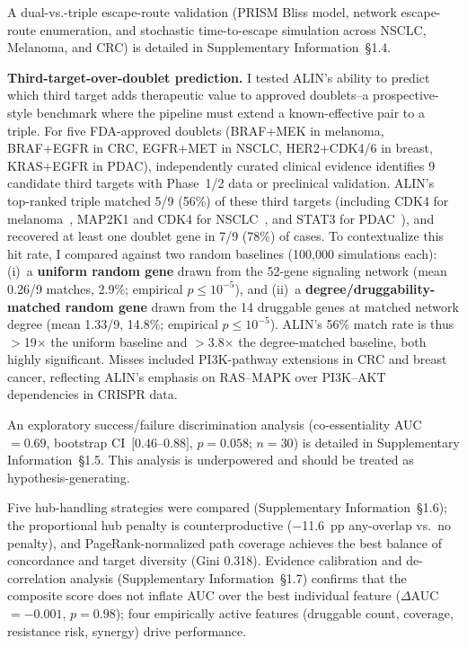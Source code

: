 \documentclass[times, twoside, watermark]{zHenriquesLab-StyleBioRxiv}
\begin{document}
A dual-vs.-triple escape-route validation (PRISM Bliss model, network escape-route enumeration, and stochastic time-to-escape simulation across NSCLC, Melanoma, and CRC) is detailed in Supplementary Information~\S1.4.

\textbf{Third-target-over-doublet prediction.}
I tested ALIN's ability to predict which third target adds therapeutic value to approved doublets--a prospective-style benchmark where the pipeline must extend a known-effective pair to a triple.
For five FDA-approved doublets (BRAF+MEK in melanoma, BRAF+EGFR in CRC, EGFR+MET in NSCLC, HER2+CDK4/6 in breast, KRAS+EGFR in PDAC), independently curated clinical evidence identifies 9 candidate third targets with Phase~1/2 data or preclinical validation.
ALIN's top-ranked triple matched 5/9 (56\%) of these third targets (including CDK4 for melanoma~\cite{Sullivan2020CDK46MEL}, MAP2K1 and CDK4 for NSCLC~\cite{Oxnard2018}, and STAT3 for PDAC~\cite{Liaki2025}), and recovered at least one doublet gene in 7/9 (78\%) of cases.
To contextualize this hit rate, I compared against two random baselines (100{,}000 simulations each): (i)~a \textbf{uniform random gene} drawn from the 52-gene signaling network (mean 0.26/9 matches, 2.9\%; empirical $p \leq 10^{-5}$), and (ii)~a \textbf{degree/druggability-matched random gene} drawn from the 14 druggable genes at matched network degree (mean 1.33/9, 14.8\%; empirical $p \leq 10^{-5}$). ALIN's 56\% match rate is thus $>$19$\times$ the uniform baseline and $>$3.8$\times$ the degree-matched baseline, both highly significant.
Misses included PI3K-pathway extensions in CRC and breast cancer, reflecting ALIN's emphasis on RAS--MAPK over PI3K--AKT dependencies in CRISPR data.

An exploratory success/failure discrimination analysis (co-essentiality AUC~$= 0.69$, bootstrap CI~$[0.46$--$0.88]$, $p = 0.058$; $n = 30$) is detailed in Supplementary Information~\S1.5. This analysis is underpowered and should be treated as hypothesis-generating.

Five hub-handling strategies were compared (Supplementary Information~\S1.6); the proportional hub penalty is counterproductive ($-$11.6~pp any-overlap vs.\ no penalty), and PageRank-normalized path coverage achieves the best balance of concordance and target diversity (Gini 0.318). Evidence calibration and de-correlation analysis (Supplementary Information~\S1.7) confirms that the composite score does not inflate AUC over the best individual feature ($\Delta$AUC~$= -0.001$, $p = 0.98$); four empirically active features (druggable count, coverage, resistance risk, synergy) drive performance.
\end{document}
